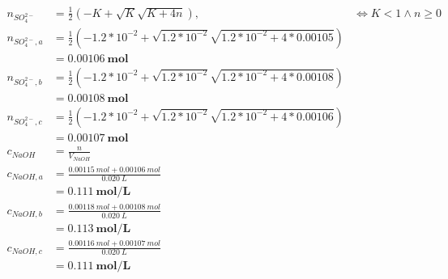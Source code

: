 \documentclass[11pt]{report}
\begin{document}
\begin{equation*}
    \begin{split}
        n_{SO_4^{2-}} &= \frac{1}{2}(-K + \sqrt{K}\sqrt{K + 4n}), & \iff K < 1 \wedge n \geq 0 \\
        n_{SO_4^{2-},a} &= \frac{1}{2}(-1.2*10^{-2} + \sqrt{1.2*10^{-2}}\sqrt{1.2*10^{-2} + 4*0.00105})\\
            &= \mathbf{0.00106\ mol}\\
        n_{SO_4^{2-},b} &= \frac{1}{2}(-1.2*10^{-2} + \sqrt{1.2*10^{-2}}\sqrt{1.2*10^{-2} + 4*0.00108})\\
            &= \mathbf{0.00108\ mol}\\
        n_{SO_4^{2-},c} &= \frac{1}{2}(-1.2*10^{-2} + \sqrt{1.2*10^{-2}}\sqrt{1.2*10^{-2} + 4*0.00106})\\
            &= \mathbf{0.00107\ mol}\\
        c_{NaOH} &= \frac{n}{V_{NaOH}}\\
        c_{NaOH,a}  &= \frac{0.00115\ mol + 0.00106\ mol}{0.020\ L}\\
            &= \mathbf{0.111\ mol/L}\\
        c_{NaOH,b}  &= \frac{0.00118\ mol + 0.00108\ mol}{0.020\ L}\\
            &= \mathbf{0.113\ mol/L}\\
        c_{NaOH,c} &= \frac{0.00116\ mol + 0.00107\ mol}{0.020\ L}\\
            &= \mathbf{0.111\ mol/L}\\
    \end{split}
\end{equation*}

\newpage
\end{document}
